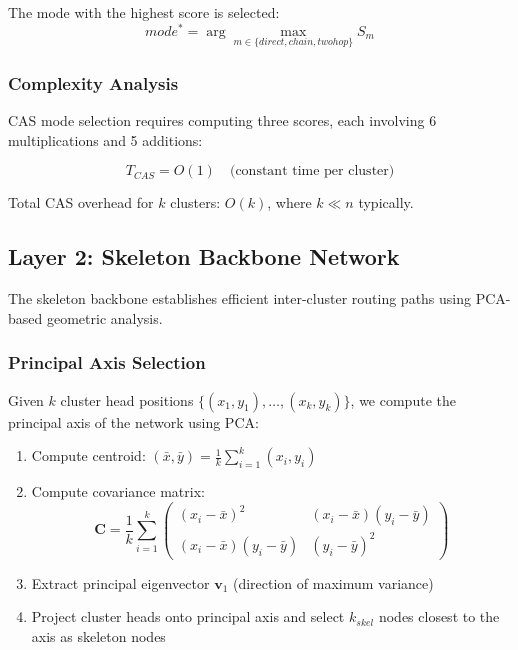 The mode with the highest score is selected:
\begin{equation}
mode^* = \arg\max_{m \in \{direct, chain, twohop\}} S_m
\label{eq:mode_selection}
\end{equation}

\subsubsection{Complexity Analysis}

CAS mode selection requires computing three scores, each involving 6
multiplications and 5 additions:

\begin{equation}
T_{CAS} = O(1) \quad \text{(constant time per cluster)}
\label{eq:cas_complexity}
\end{equation}

Total CAS overhead for $k$ clusters: $O(k)$, where $k \ll n$ typically.

\subsection{Layer 2: Skeleton Backbone Network}

The skeleton backbone establishes efficient inter-cluster routing paths
using PCA-based geometric analysis.

\subsubsection{Principal Axis Selection}

Given $k$ cluster head positions $\{(x_1, y_1), \ldots, (x_k, y_k)\}$,
we compute the principal axis of the network using PCA:

\begin{enumerate}
    \item Compute centroid: $(\bar{x}, \bar{y}) = \frac{1}{k}\sum_{i=1}^{k}(x_i, y_i)$

    \item Compute covariance matrix:
    \begin{equation}
    \mathbf{C} = \frac{1}{k}\sum_{i=1}^{k}
    \begin{pmatrix}
    (x_i - \bar{x})^2 & (x_i - \bar{x})(y_i - \bar{y}) \\
    (x_i - \bar{x})(y_i - \bar{y}) & (y_i - \bar{y})^2
    \end{pmatrix}
    \label{eq:covariance}
    \end{equation}

    \item Extract principal eigenvector $\mathbf{v}_1$ (direction of
    maximum variance)

    \item Project cluster heads onto principal axis and select $k_{skel}$
    nodes closest to the axis as skeleton nodes
\end{enumerate}


